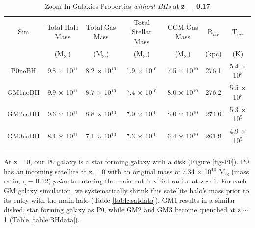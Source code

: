\documentclass[]{emulateapj}
\begin{document}
\begin{table}[ht] %
\caption{Zoom-In Galaxies Properties \textit{without BHs} at  \textbf{z = 0.17}} %
\centering %
\begin{tabular}{c c c c c c c} %
\hline\hline %
Sim & Total Halo Mass  & Total Gas Mass & Total Stellar Mass & CGM Gas Mass & R$_{vir}$ & T$_{vir}$\\
 & (M$_{\odot}$) & (M$_{\odot}$) & (M$_{\odot}$) & (M$_{\odot}$) & (kpc) & (K) \\ [0.5ex] %
\hline %
P0noBH & 9.8 $\times$ 10$^{11}$ & 8.2 $\times$ 10$^{10}$ & 7.9 $\times$ 10$^{10}$ & 7.5 $\times$ 10$^{10}$ & 276.1 & 5.4 $\times$ 10$^5$ \\ %
GM1noBH & 9.9 $\times$ 10$^{11}$ & 8.7 $\times$ 10$^{10}$ & 7.4 $\times$ 10$^{10}$ & 8.0 $\times$ 10$^{10}$ & 276.2 & 5.5 $\times$ 10$^5$ \\
GM2noBH & 9.6 $\times$ 10$^{11}$ & 8.8 $\times$ 10$^{10}$ & 7.0 $\times$ 10$^{10}$ & 8.0 $\times$ 10$^{10}$ & 274.0 & 5.3 $\times$ 10$^5$ \\ %
GM3noBH & 8.4 $\times$ 10$^{11}$ & 7.1 $\times$ 10$^{10}$ & 7.3 $\times$ 10$^{10}$ & 6.4 $\times$ 10$^{10}$ & 261.9 & 4.9 $\times$ 10$^5$ \\ [1ex] %
\hline %
\vspace{5.111mm}
\end{tabular}
\label{table:noBHdata} %
\end{table}


At z = 0, our P0 galaxy is a star forming galaxy with a disk (Figure \ref{fig-P0}). P0 has an incoming satellite at z = 0 with an original mass of 7.34 $\times$ 10$^{10}$ M$_{\odot}$ (mass ratio, q = 0.12) \textit{prior} to entering the main halo's virial radius at z $\sim$ 1. For each GM galaxy simulation, we systematically shrink this satellite halo's mass prior to its entry with the main halo (Table \ref{table:satdata}). GM1 results in a similar disked, star forming galaxy as P0, while GM2 and GM3 become quenched at z $\sim$ 1 (Table \ref{table:BHdata}).

\end{document}
